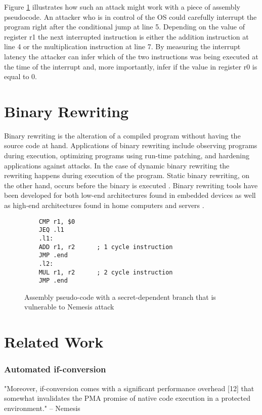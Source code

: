 Figure \ref{fig:pseudo-assembly} illustrates how such an attack might work with a piece of assembly pseudocode. An attacker who is in control of the OS could carefully interrupt the program right
after the conditional jump at line 5. Depending on the value of register r1 the next interrupted instruction is either the addition instruction at line 4 or the multiplication instruction at line 7. 
By measuring the interrupt latency the attacker can infer which of the two instructions was being executed at the time of the interrupt and, more importantly, infer if the value in register r0 is equal to 0. 

\section{Binary Rewriting}
Binary rewriting is the alteration of a compiled program without having the source code at hand. 
Applications of binary rewriting include observing programs during execution, optimizing programs using run-time patching, and 
hardening applications against attacks. In the case of dynamic binary rewriting the rewriting happens during execution of the program. 
Static binary rewriting, on the other hand, occurs before the binary is executed \cite{rewriting-survey}. 
Binary rewriting tools have been developed for both low-end architectures found in embedded devices \cite{microsbs} as well as high-end architectures found in home computers and servers 
\cite{E9Patch, instruction-punning, Dinesh2020RetroWriteSI}. 

\lstset{language=[x64]Assembler, numbers=left, stepnumber=1, frame=single}
\begin{figure}

    \begin{lstlisting}
	CMP r1, $0
	JEQ .l1
	.l1: 
	ADD r1, r2 		; 1 cycle instruction
	JMP .end
	.l2: 
	MUL r1, r2 		; 2 cycle instruction
	JMP .end
	\end{lstlisting}
	\caption{Assembly pseudo-code with a secret-dependent branch that is vulnerable to Nemesis attack}
	\label{fig:pseudo-assembly}
\end{figure}



\section{Related Work}
\subsubsection{Automated if-conversion}
"Moreover, if-conversion comes with a significant performance overhead [12] that somewhat invalidates the
PMA promise of native code execution in a protected environment." -- Nemesis 

